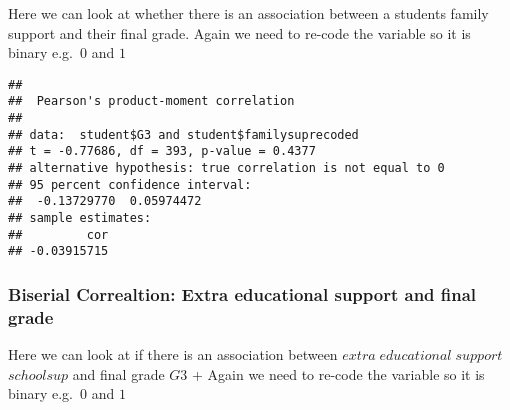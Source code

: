\documentclass[
]{book}
\newenvironment{Shaded}{\begin{snugshade}}{\end{snugshade}}
\newcommand{\DecValTok}[1]{\textcolor[rgb]{0.00,0.00,0.81}{#1}}
\newcommand{\DocumentationTok}[1]{\textcolor[rgb]{0.56,0.35,0.01}{\textbf{\textit{#1}}}}
\newcommand{\FunctionTok}[1]{\textcolor[rgb]{0.13,0.29,0.53}{\textbf{#1}}}
\newcommand{\NormalTok}[1]{#1}
\newcommand{\OtherTok}[1]{\textcolor[rgb]{0.56,0.35,0.01}{#1}}
\newcommand{\SpecialCharTok}[1]{\textcolor[rgb]{0.81,0.36,0.00}{\textbf{#1}}}
\newcommand{\StringTok}[1]{\textcolor[rgb]{0.31,0.60,0.02}{#1}}
\theoremstyle{definition}
\theoremstyle{definition}
\theoremstyle{definition}
\theoremstyle{definition}
\theoremstyle{remark}
\begin{document}
Here we can look at whether there is an association between a students family support and their final grade. Again we need to re-code the variable so it is binary e.g.~\(0\) and \(1\)

\begin{Shaded}
\end{Shaded}

\begin{verbatim}
## 
##  Pearson's product-moment correlation
## 
## data:  student$G3 and student$familysuprecoded
## t = -0.77686, df = 393, p-value = 0.4377
## alternative hypothesis: true correlation is not equal to 0
## 95 percent confidence interval:
##  -0.13729770  0.05974472
## sample estimates:
##         cor 
## -0.03915715
\end{verbatim}

\hypertarget{biserial-correaltion-extra-educational-support-and-final-grade}{%
\subsubsection{Biserial Correaltion: Extra educational support and final grade}\label{biserial-correaltion-extra-educational-support-and-final-grade}}

Here we can look at if there is an association between \(extra\;educational\; support\) \(schoolsup\) and final grade \(G3\)
+ Again we need to re-code the variable so it is binary e.g.~\(0\) and \(1\)

\begin{Shaded}
\end{Shaded}
\end{document}
